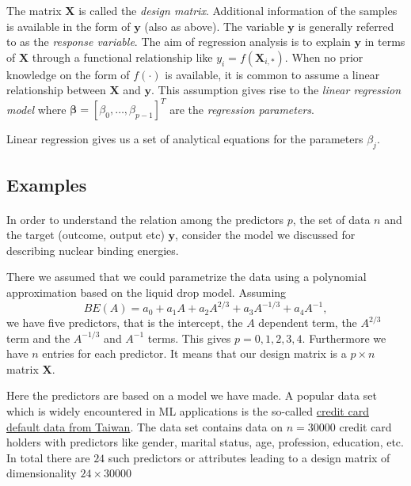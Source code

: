 \documentclass[%
oneside,                 %
final,                   %
10pt]{article}
\begin{document}
The matrix $\mathbf{X}$ is called the \emph{design
matrix}. Additional information of the samples is available in the
form of $\bm{y}$ (also as above). The variable $\bm{y}$ is
generally referred to as the \emph{response variable}. The aim of
regression analysis is to explain $\bm{y}$ in terms of
$\bm{X}$ through a functional relationship like $y_i =
f(\mathbf{X}_{i,\ast})$. When no prior knowledge on the form of
$f(\cdot)$ is available, it is common to assume a linear relationship
between $\bm{X}$ and $\bm{y}$. This assumption gives rise to
the \emph{linear regression model} where $\bm{\beta} = [\beta_0, \ldots,
\beta_{p-1}]^{T}$ are the \emph{regression parameters}. 

Linear regression gives us a set of analytical equations for the parameters $\beta_j$.





\subsection*{Examples}

\paragraph{}
In order to understand the relation among the predictors $p$, the set of data $n$ and the target (outcome, output etc) $\bm{y}$,
consider the model we discussed for describing nuclear binding energies. 

There we assumed that we could parametrize the data using a polynomial approximation based on the liquid drop model.
Assuming 
\[
BE(A) = a_0+a_1A+a_2A^{2/3}+a_3A^{-1/3}+a_4A^{-1},
\]
we have five predictors, that is the intercept, the $A$ dependent term, the $A^{2/3}$ term and the $A^{-1/3}$ and $A^{-1}$ terms.
This gives $p=0,1,2,3,4$. Furthermore we have $n$ entries for each predictor. It means that our design matrix is a 
$p\times n$ matrix $\bm{X}$.

Here the predictors are based on a model we have made. A popular data set which is widely encountered in ML applications is the
so-called \href{{https://www.sciencedirect.com/science/article/pii/S0957417407006719?via%
\end{document}
